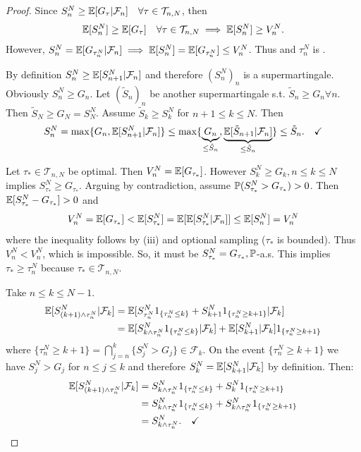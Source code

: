 \begin{proof}
     Since $S_n^N \ge \mathbb E[G_\tau | \mathcal{F}_n] \quad \forall \tau \in \mathcal{T}_{n,N}$, then
    $$\mathbb E[S_n^N] \ge \mathbb E[G_\tau] \quad \forall \tau \in \mathcal{T}_{n,N} \implies \mathbb E[S_n^N] \ge V_n^N.$$
    However, $S_n^N = \mathbb E[G_{\tau_n^N} | \mathcal{F}_n] \implies \mathbb E[S_n^N] = \mathbb E[G_{\tau_n^N}] \le V_n^N$.
    Thus  and $\tau_n^N$ is .

     By definition $S_n^N \ge \mathbb E[S_{n+1}^N | \mathcal{F}_n]$ and therefore $(S_n^N)_n$ is a supermartingale. Obviously $S_n^N \ge G_n$.
    Let $(\tilde{S}_n)_n$ be another supermartingale s.t. $\tilde{S}_n \ge G_n \forall n$.
    Then $\tilde{S}_N \ge G_N = S_N^N$. Assume $\tilde{S}_k \ge S_k^N$ for $n+1 \le k \le N$. Then
    $$S_n^N = \max \{G_n, \mathbb E[S_{n+1}^N | \mathcal{F}_n]\} \le \max \{\underbrace{G_n}_{\le \tilde{S}_n}, \underbrace{\mathbb E[\tilde{S}_{n+1} | \mathcal{F}_n]}_{\le \tilde{S}_n}\} \le \tilde{S}_n. \quad \checkmark$$

     Let $\tau_* \in \mathcal{T}_{n,N}$ be optimal. Then $V_n^N = \mathbb E[G_{\tau_*}]$. However $S_k^N \ge G_k, n \le k \le N$ implies $S_{\tau_*}^N \ge G_{\tau_*}$. Arguing by contradiction, assume $\mathbb P(S_{\tau_*}^N > G_{\tau_*}) > 0$. Then $\mathbb E[S_{\tau_*}^N - G_{\tau_*}] > 0$ and
    $$V_n^N = \mathbb E[G_{\tau_*}] < \mathbb E[S_{\tau_*}^N] = \mathbb E[\mathbb E[S_{\tau_*}^N | \mathcal{F}_n]] \le \mathbb E[S_n^N] = V_n^N$$
    where the inequality follows by (iii) and optional sampling ($\tau_*$ is bounded).
    Thus $V_n^N < V_n^N$, which is impossible.
    So, it must be $S_{\tau_*}^N = G_{\tau_*}, \mathbb P$-a.s. This implies $\tau_* \ge \tau_n^N$ because $\tau_* \in \mathcal{T}_{n,N}$.

     Take $n \le k \le N-1$.
    \begin{align*}
        \mathbb E[S_{(k+1) \wedge \tau_n^N}^N | \mathcal{F}_k] &= \mathbb E[S_{\tau_n^N}^N 1_{\{\tau_n^N \le k\}} + S_{k+1}^N 1_{\{\tau_n^N \ge k+1\}} | \mathcal{F}_k] \\
        &= \mathbb E[S_{k \wedge \tau_n^N}^N 1_{\{\tau_n^N \le k\}} | \mathcal{F}_k] + \mathbb E[S_{k+1}^N | \mathcal{F}_k] 1_{\{\tau_n^N \ge k+1\}}
    \end{align*}
    where $\{\tau_n^N \ge k+1\} = \bigcap_{j=n}^k \{S_j^N > G_j\} \in \mathcal{F}_k$.
    On the event $\{\tau_n^N \ge k+1\}$ we have $S_j^N > G_j$ for $n \le j \le k$ and therefore $S_k^N = \mathbb E[S_{k+1}^N | \mathcal{F}_k]$ by definition. Then:
    \begin{align*}
        \mathbb E[S_{(k+1) \wedge \tau_n^N}^N | \mathcal{F}_k] &= S_{k \wedge \tau_n^N}^N 1_{\{\tau_n^N \le k\}} + S_k^N 1_{\{\tau_n^N \ge k+1\}} \\
        &= S_{k \wedge \tau_n^N}^N 1_{\{\tau_n^N \le k\}} + S_{k \wedge \tau_n^N}^N 1_{\{\tau_n^N \ge k+1\}} \\
        &= S_{k \wedge \tau_n^N}^N. \quad \checkmark
    \end{align*}
\end{proof}

